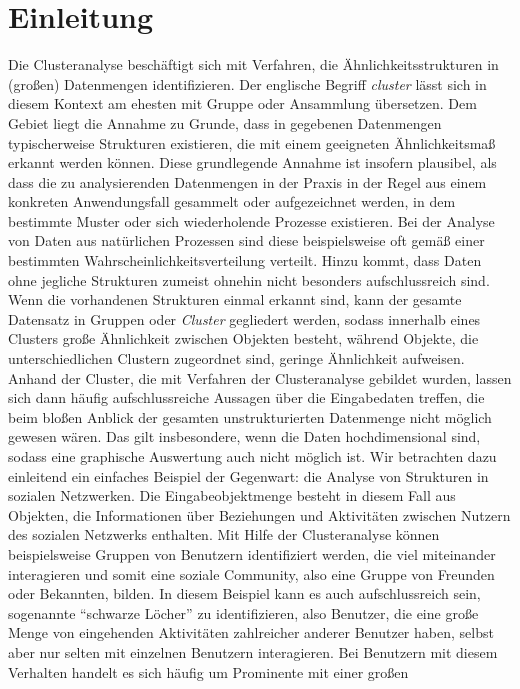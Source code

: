 \section{Einleitung}
\label{section:introduction}

Die Clusteranalyse beschäftigt sich mit Verfahren, die Ähnlichkeitsstrukturen in (großen) Datenmengen identifizieren. Der englische
Begriff \emph{cluster} lässt sich in diesem Kontext am ehesten mit Gruppe oder Ansammlung übersetzen. Dem Gebiet liegt die
Annahme zu Grunde, dass in gegebenen Datenmengen typischerweise Strukturen existieren, die mit einem geeigneten Ähnlichkeitsmaß
erkannt werden können. Diese grundlegende Annahme ist insofern plausibel, als dass die zu analysierenden Datenmengen in der Praxis
in der Regel aus einem konkreten Anwendungsfall gesammelt oder aufgezeichnet werden, in dem bestimmte Muster oder sich wiederholende
Prozesse existieren. Bei der Analyse von Daten aus natürlichen Prozessen sind diese beispielsweise oft gemäß einer bestimmten
Wahrscheinlichkeitsverteilung verteilt. Hinzu kommt, dass Daten ohne jegliche Strukturen zumeist ohnehin nicht besonders
aufschlussreich sind.
Wenn die vorhandenen Strukturen einmal erkannt sind, kann der gesamte Datensatz in Gruppen oder \emph{Cluster}
gegliedert werden, sodass innerhalb eines Clusters große Ähnlichkeit zwischen Objekten besteht, während Objekte, die
unterschiedlichen Clustern zugeordnet sind, geringe Ähnlichkeit aufweisen. Anhand der Cluster, die mit Verfahren der Clusteranalyse
gebildet wurden, lassen sich dann häufig aufschlussreiche Aussagen über die Eingabedaten treffen, die beim bloßen Anblick der
gesamten unstrukturierten Datenmenge nicht möglich gewesen wären. Das gilt insbesondere, wenn die Daten hochdimensional sind,
sodass eine graphische Auswertung auch nicht möglich ist.
\absatz
Wir betrachten dazu einleitend ein einfaches Beispiel der Gegenwart: die Analyse von Strukturen in sozialen Netzwerken.
Die Eingabeobjektmenge besteht in diesem Fall aus Objekten, die Informationen über Beziehungen und Aktivitäten zwischen
Nutzern des sozialen Netzwerks enthalten. Mit Hilfe der Clusteranalyse können beispielsweise Gruppen von Benutzern
identifiziert werden, die viel miteinander interagieren und somit eine soziale Community, also eine Gruppe von Freunden
oder Bekannten, bilden. In diesem Beispiel kann es auch aufschlussreich sein, sogenannte "`schwarze Löcher"' zu identifizieren,
also Benutzer, die eine große Menge von eingehenden Aktivitäten zahlreicher anderer Benutzer haben, selbst aber nur selten
mit einzelnen Benutzern interagieren. Bei Benutzern mit diesem Verhalten handelt es sich häufig um Prominente mit einer großen
